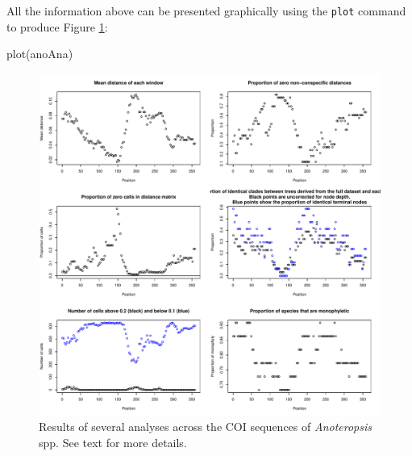 \documentclass{article}
\newcommand{\fun}[1]{\texttt{#1}}
\begin{document}
All the information above can be presented graphically using the \fun{plot} command to produce Figure \ref{slideAnalyses.fig}:

\begin{console}
plot(anoAna)
\end{console}

\begin{figure}[tbp]
	\includegraphics[width=\textwidth]{slideAnalyses}
	\caption{Results of several analyses across the COI sequences of \emph{Anoteropsis} spp. See text for more details.}%
	\label{slideAnalyses.fig}
\end{figure}
\end{document}
